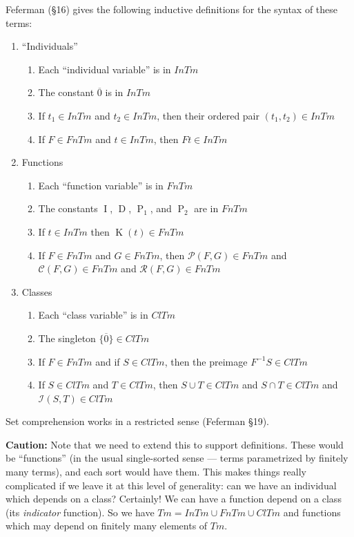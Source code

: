 \begin{node}
Feferman (\S16) gives the following inductive definitions for the syntax of
these terms:
\begin{enumerate}
\item ``Individuals''
\begin{enumerate}
\item Each ``individual variable'' is in $\textit{InTm}$
\item The constant $\overline{0}$ is in $\textit{InTm}$
\item If $t_{1}\in\textit{InTm}$ and $t_{2}\in\textit{InTm}$, then
  their ordered pair $(t_{1},t_{2})\in\textit{InTm}$
\item If $F\in\textit{FnTm}$ and $t\in\textit{InTm}$, then $Ft\in\textit{InTm}$
\end{enumerate}
\item Functions
\begin{enumerate}
\item Each ``function variable'' is in $\textit{FnTm}$
\item The constants $\operatorname{I}$, $\operatorname{D}$,
  $\operatorname{P}_{1}$, and $\operatorname{P}_{2}$ are in $\textit{FnTm}$
\item If $t\in\textit{InTm}$ then $\operatorname{K}(t)\in\textit{FnTm}$
\item If $F\in\textit{FnTm}$ and $G\in\textit{FnTm}$, then
  $\mathcal{P}(F,G)\in\textit{FnTm}$ and
  $\mathcal{C}(F,G)\in\textit{FnTm}$ and $\mathcal{R}(F,G)\in\textit{FnTm}$
\end{enumerate}
\item Classes
\begin{enumerate}
\item Each ``class variable'' is in $\textit{ClTm}$
\item The singleton $\{\overline{0}\}\in\textit{ClTm}$
\item If $F\in\textit{FnTm}$ and if $S\in\textit{ClTm}$, then the
  preimage $F^{-1}S\in\textit{ClTm}$
\item If $S\in\textit{ClTm}$ and $T\in\textit{ClTm}$, then $S\cup T\in\textit{ClTm}$
  and $S\cap T\in\textit{ClTm}$ and $\mathcal{I}(S,T)\in\textit{ClTm}$
\end{enumerate}
\end{enumerate}
Set comprehension works in a restricted sense (Feferman \S19).

\textbf{Caution:} Note that we need to extend this to support definitions. These would
be ``functions'' (in the usual single-sorted sense --- terms
parametrized by finitely many terms), and each sort would have them.
This makes things really complicated if we leave it at this level of
generality: can we have an individual which depends on a class?
Certainly! We can have a function depend on a class (its
\emph{indicator} function). So we have $\textit{Tm}=\textit{InTm}\cup\textit{FnTm}\cup\textit{ClTm}$
and functions which may depend on finitely many elements of
$\textit{Tm}$. 
\end{node}

